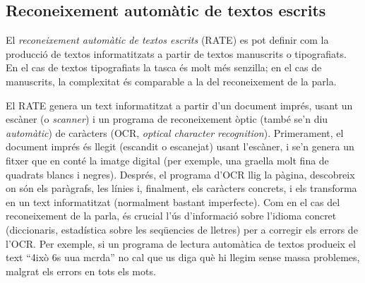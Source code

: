 \subsection{Reconeixement automàtic de textos escrits}
\label{s3:recautcar}

El \emph{reconeixement automàtic de textos escrits} (RATE) es pot definir
  com la producció de textos informatitzats a partir de textos
  manuscrits o tipografiats. En el cas de textos tipografiats la
  tasca és molt més senzilla; en el cas de manuscrits, la complexitat
  és comparable a la del reconeixement de la parla.
  
  El RATE genera un text informatitzat a partir d'un document
  imprés, usant un escàner (o \emph{scanner}) i un programa
  de reconeixement òptic (tam\-bé se'n diu {\em
    automàtic}) de caràcters (OCR, \emph{optical character
    recognition}).  Primerament, el document imprés és llegit
  (escandit o escanejat) usant l'escàner, i se'n genera un fitxer
  que en conté la imatge digital (per exemple, una graella molt fina
  de quadrats blancs i negres).  Després, el programa d'OCR llig
  la pàgina, descobreix on són els paràgrafs, les
  línies i, finalment, els caràcters concrets, i els
  transforma en un text informatitzat (normalment bastant imperfecte).
  Com en el cas del reconeixement de la parla, és crucial l'ús
  d'informació sobre l'idioma concret (diccionaris,
  estadística sobre les seqüencies de lletres) per a corregir els
  errors de l'OCR.  Per exemple, si un programa de lectura automàtica
  de textos produeix el text ``4ixò 6s uua mcrda'' no cal que us diga
  què hi llegim sense massa problemes, malgrat els errors en tots els
  mots.  


